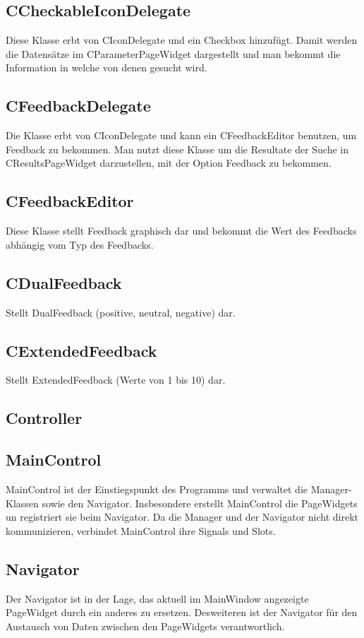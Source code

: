 \subsection*{CCheckableIconDelegate}
Diese Klasse erbt von CIconDelegate und ein Checkbox hinzufügt. Damit werden die Datensätze im CParameterPageWidget dargestellt und man bekommt die Information in welche von denen gesucht wird. 

\subsection*{CFeedbackDelegate}
Die Klasse erbt von CIconDelegate und kann ein CFeedbackEditor benutzen, um Feedback zu bekommen. Man nutzt diese Klasse um die Resultate der Suche in CResultsPageWidget darzustellen, mit der Option Feedback zu bekommen. 

\subsection*{CFeedbackEditor}
Diese Klasse stellt Feedback graphisch dar und bekommt die Wert des Feedbacks abhängig vom Typ des Feedbacks.

\subsection*{CDualFeedback}

Stellt DualFeedback (positive, neutral, negative) dar.

\subsection*{CExtendedFeedback}
Stellt ExtendedFeedback (Werte von 1 bis 10) dar.

\pagebreak

\subsection{Controller}
\subsection*{MainControl}
MainControl ist der Einstiegspunkt des Programms und verwaltet die Manager-Klassen sowie den Navigator. Insbesondere erstellt MainControl die PageWidgets un registriert sie beim Navigator.
Da die Manager und der Navigator nicht direkt kommunizieren, verbindet MainControl ihre Signals und Slots.

\subsection*{Navigator}
Der Navigator ist in der Lage, das aktuell im MainWindow angezeigte PageWidget durch ein anderes zu ersetzen. Desweiteren ist der Navigator für den Austausch von Daten zwischen den PageWidgets verantwortlich.

